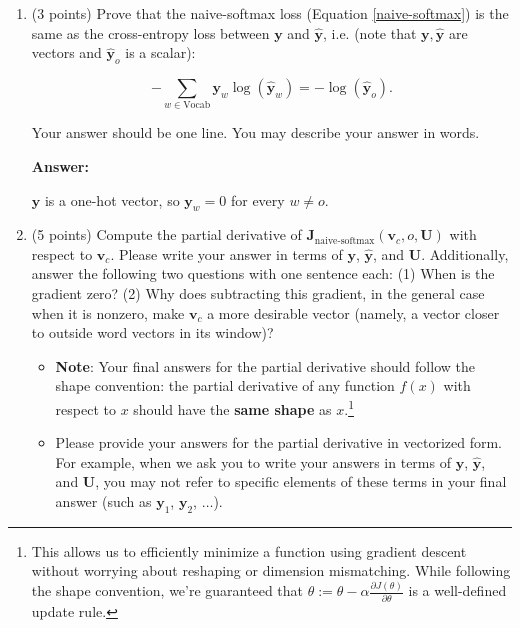 \documentclass{article}
\newenvironment{answer}{
    {\bf Answer:} \sf \begingroup\color{red}
}{\endgroup}%
\begin{document}
\clearpage 
\begin{enumerate}[label=(\alph*)]
\item (3 points) 
Prove that the naive-softmax loss (Equation \ref{naive-softmax}) is the same as the cross-entropy loss between $\bm y$ and $\hat{\bm y}$, i.e. (note that $\bm y, \hat{\bm y}$ are vectors and $\hat{\bm y}_o$ is a scalar):

\begin{equation} 
-\sum_{w \in \text{Vocab}} \bm y_w \log(\hat{\bm y}_w) = - \log (\hat{\bm y}_o).
\end{equation}

Your answer should be one line. You may describe your answer in words.
\begin{shaded}
\begin{answer}
$\bm y$ is a one-hot vector, so ${\bm y}_w = 0$ for every $w \neq o$.
\end{answer}
\end{shaded}

\item (5 points) Compute the partial derivative of $\bm J_{\text{naive-softmax}}(\bm v_c, o, \bm U)$ with respect to $\bm v_c$. Please write your answer in terms of $\bm y$, $\hat{\bm y}$, and $\bm U$. Additionally, answer the following two questions with one sentence each: (1) When is the gradient zero? (2) Why does subtracting this gradient, in the general case when it is nonzero, make $\bm v_c$ a more desirable vector (namely, a vector closer to outside word vectors in its window)?

\begin{itemize} 
\item \textbf{Note}: Your final answers for the partial derivative should follow the shape convention: the partial derivative of any function $f(x)$ with respect to $x$ should have the \textbf{same shape} as $x$.\footnote{This allows us to efficiently minimize a function using gradient descent without worrying about reshaping or dimension mismatching. While following the shape convention, we're guaranteed that $\theta:= \theta - \alpha\frac{\partial J(\theta)}{\partial \theta}$ is a well-defined update rule.}
\item Please provide your answers for the partial derivative in vectorized form. For example, when we ask you to write your answers in terms of $\bm y$, $\hat{\bm y}$, and $\bm U$, you may not refer to specific elements of these terms in your final answer (such as $\bm y_1$, $\bm y_2$, $\dots$). 
\end{itemize}




\end{enumerate}
\end{document}

